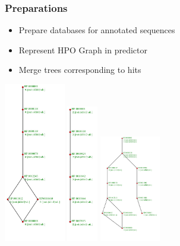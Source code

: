 \documentclass{beamer}
\begin{document}
\begin{frame}
	\frametitle{Preparations}
		\begin{itemize}
			\item Prepare databases for annotated sequences
			\item Represent HPO Graph in predictor
			\item Merge trees corresponding to hits
		\end{itemize}
		\includegraphics[width=0.2\textwidth]{p1.jpg}
		\includegraphics[width=0.1\textwidth]{p2.jpg}
		\includegraphics[width=0.2\textwidth]{g.jpg}

		
\end{frame}
\end{document}
